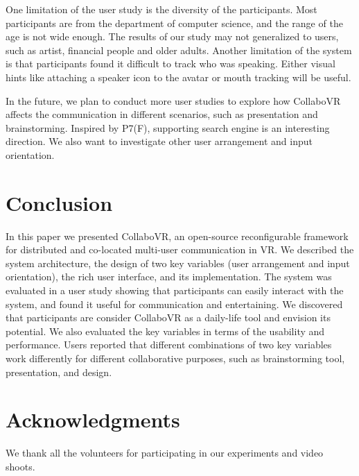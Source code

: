 \documentclass{sigchi}
\begin{document}
One limitation of the user study is the diversity of the participants. Most participants are from the department of computer science, and the range of the age is not wide enough. The results of our study may not generalized to users, such as artist, financial people and older adults. Another limitation of the system is that participants found it difficult to track who was speaking. Either visual hints like attaching a speaker icon to the avatar or mouth tracking will be useful.

In the future, we plan to conduct more user studies to explore how CollaboVR affects the communication in different scenarios, such as presentation and brainstorming. Inspired by P7(F), supporting search engine is an interesting direction. We also want to investigate other user arrangement and input orientation.

\section{Conclusion}
In this paper we presented CollaboVR, an open-source reconfigurable framework for distributed and co-located multi-user communication in VR. We described the system architecture, the design of two key variables (user arrangement and input orientation), the rich user interface, and its implementation. The system was evaluated in a user study showing that participants can easily interact with the system, and found it useful for communication and entertaining. We discovered that participants are consider CollaboVR as a daily-life tool and envision its potential. We also evaluated the key variables in terms of the usability and performance. Users reported that different combinations of two key variables work differently for different collaborative purposes, such as brainstorming tool, presentation, and design.

\section{Acknowledgments}
We thank all the volunteers for participating in our experiments and video shoots.
\end{document}
